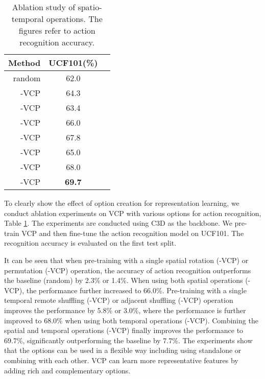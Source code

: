 \documentclass[letterpaper]{article}
\begin{document}
\begin{table}
    \centering
    \begin{tabular}{rcc}
        \hline
    Method  &UCF101(\%)  \\
    \hline
    random & 62.0 \\
        \hline
    -VCP&64.3\\
    -VCP&63.4\\
    -VCP&66.0\\
        \hline
    -VCP &67.8\\
    -VCP & 65.0\\
    -VCP&68.0\\
        \hline
   -VCP&\textbf{69.7}\\
        \hline
        \end{tabular}
    \caption{Ablation study of spatio-temporal operations. The figures refer to action recognition accuracy.}
    \label{table:options}
\end{table}



To clearly show the effect of option creation for representation learning, we conduct ablation experiments on VCP with various options for action recognition, Table \ref{table:options}. The experiments are conducted using C3D as the backbone. We pre-train VCP and then fine-tune the action recognition model on UCF101. The recognition accuracy is evaluated on the first test split.

It can be seen that when pre-training with a single spatial rotation (-VCP) or permutation (-VCP) operation, the accuracy of action recognition outperforms the baseline (random) by  2.3\% or 1.4\%. When using both spatial operations (-VCP), the performance further increased to 66.0\%. Pre-training with a single temporal remote shuffling (-VCP) or adjacent shuffling (-VCP) operation improves the performance by 5.8\% or 3.0\%, where the performance is further improved to 68.0\% when using both temporal operations (-VCP). Combining the spatial and temporal operations (-VCP) finally improves the performance to 69.7\%, significantly outperforming the baseline by 7.7\%. The experiments show that the options can be used in a flexible way including using standalone or combining with each other. VCP can learn more representative features by adding rich and complementary options. 
\end{document}
